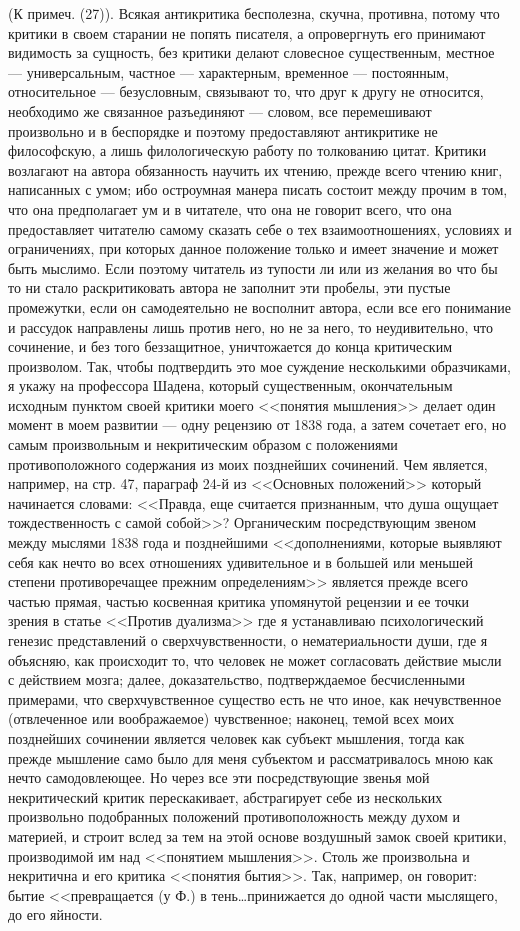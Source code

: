 \documentclass[12pt]{article}
\begin{document}
(К примеч. (27)). Всякая антикритика бесполезна, скучна, противна, потому что критики в своем старании не попять писателя, а опровергнуть его принимают видимость за сущность, без критики делают словесное существенным, местное --- универсальным, частное --- характерным, временное --- постоянным, относительное --- безусловным, связывают то, что друг к другу не относится, необходимо же связанное разъединяют --- словом, все перемешивают произвольно и в беспорядке и поэтому предоставляют антикритике не философскую, а лишь филологическую работу по толкованию цитат. Критики возлагают на автора обязанность научить их чтению, прежде всего чтению книг, написанных с умом; ибо остроумная манера писать состоит между прочим в том, что она предполагает ум и в читателе, что она не говорит всего, что она предоставляет читателю самому сказать себе о тех взаимоотношениях, условиях и ограничениях, при которых данное положение только и имеет значение и может быть мыслимо. Если поэтому читатель из тупости ли или из желания во что бы то ни стало раскритиковать автора не заполнит эти пробелы, эти пустые промежутки, если он самодеятельно не восполнит автора, если все его понимание и рассудок направлены лишь против него, но не за него, то неудивительно, что сочинение, и без того беззащитное, уничтожается до конца критическим произволом. Так, чтобы подтвердить это мое суждение несколькими образчиками, я укажу на профессора Шадена, который существенным, окончательным исходным пунктом своей критики моего <<понятия мышления>> делает один момент в моем развитии --- одну рецензию от 1838 года, а затем сочетает его, но самым произвольным и некритическим образом с положениями противоположного содержания из моих позднейших сочинений. Чем является, например, на стр. 47, параграф 24-й из <<Основных положений>>  который начинается словами: <<Правда, еще считается признанным, что душа ощущает тождественность с самой собой>>? Органическим посредствующим звеном между мыслями 1838 года и позднейшими <<дополнениями, которые выявляют себя как нечто во всех отношениях удивительное и в большей или меньшей степени противоречащее прежним определениям>>  является прежде всего частью прямая, частью косвенная критика упомянутой рецензии и ее точки зрения в статье <<Против дуализма>>  где я устанавливаю психологический генезис представлений о сверхчувственности, о нематериальности души, где я объясняю, как происходит то, что человек не может согласовать действие мысли с действием мозга; далее, доказательство, подтверждаемое бесчисленными примерами, что сверхчувственное существо есть не что иное, как нечувственное (отвлеченное или воображаемое) чувственное; наконец, темой всех моих позднейших сочинении является человек как субъект мышления, тогда как прежде мышление само было для меня субъектом и рассматривалось мною как нечто самодовлеющее. Но через все эти посредствующие звенья мой некритический критик перескакивает, абстрагирует себе из нескольких произвольно подобранных положений противоположность между духом и материей, и строит вслед за тем на этой основе воздушный замок своей критики, производимой им над <<понятием мышления>>. Столь же произвольна и некритична и его критика <<понятия бытия>>. Так, например, он говорит: бытие <<превращается (у Ф.) в тень\dots принижается до одной части мыслящего, до его яйности. 
\end{document}
